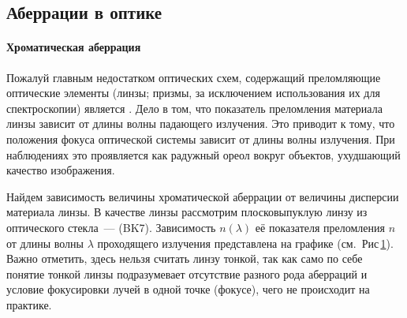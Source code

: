 \subsection{Аберрации в оптике}
\paragraph{Хроматическая аберрация}
Пожалуй главным недостатком оптических схем, содержащий преломляющие оптические элементы (линзы; призмы, за исключением использования их для спектроскопии) является . Дело в том, что показатель преломления материала линзы зависит от длины волны падающего излучения. Это приводит к тому, что положения фокуса оптической системы зависит от длины волны излучения. При наблюдениях это проявляется как радужный ореол вокруг объектов, ухудшающий качество изображения.

\begin{figure}
    \centering
    \vspace{-1pc}
    \caption{}
    \label{pic:crown-dispersion}
\end{figure}
Найдем зависимость величины хроматической аберрации от величины дисперсии материала линзы. В качестве линзы рассмотрим плосковыпуклую линзу из оптического стекла~---  (BK7). Зависимость $n(\lambda)$ её показателя преломления $n$ от длины волны $\lambda$ проходящего излучения представлена на графике (см.~Рис\,\ref{pic:crown-dispersion}). Важно отметить, здесь нельзя считать линзу тонкой, так как само по себе понятие тонкой линзы подразумевает отсутствие разного рода аберраций и условие фокусировки лучей в одной точке (фокусе), чего не происходит на практике.

